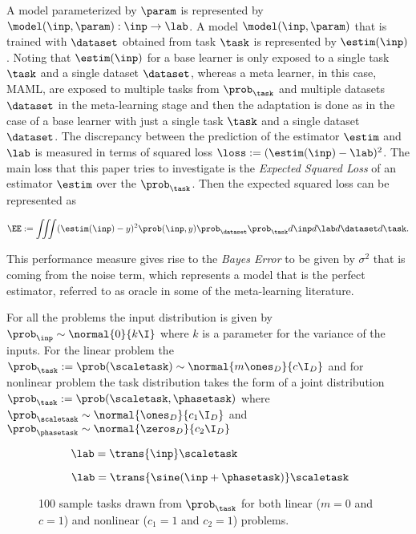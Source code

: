 A model parameterized by $\param$ is represented by $\model(\inp, \param):\inp\to\lab$. A model $\model(\inp, \param)$ that is trained with $\dataset$ obtained from  task $\task$ is represented by $\estim(\inp)$. Noting that $\estim(\inp)$ for a base learner is only exposed to a single task $\task$ and a single dataset $\dataset$, whereas a meta learner, in this case, MAML, are exposed to multiple tasks from $\prob_\task$ and multiple datasets $\dataset$ in the meta-learning stage and then the adaptation is done as in the case of a base learner with just a single task $\task$ and a single dataset $\dataset$.  The discrepancy between the prediction of the estimator $\estim$ and $\lab$ is measured in terms of squared loss $\loss:=(\estim(\inp)-\lab)^2$. The main loss that this paper tries to investigate is the \textit{Expected Squared Loss} of an estimator $\estim$ over the $\prob_{\task}$. Then the expected squared loss can be represented as

\begin{equation}\label{eq:ee}
  \EE:= \iiint(\estim(\inp) - y)^2\prob(\inp, y)\prob_{\dataset}\prob_{\task} d\inp d\lab d\dataset d\task.
\end{equation}


This performance measure gives rise to the \textit{Bayes Error} to be given by $\sigma^2$ that is coming from the noise term, which represents a model that is the perfect estimator, referred to as oracle in some of the meta-learning literature.

For all the problems the input distribution is given by $\prob_\inp\sim\normal{0}{k\I}$ where $k$ is a parameter for the variance of the inputs. For the linear problem the $\prob_\task:=\prob(\scaletask)\sim\normal{{m\ones_{D}}}{{c\I_{D}}}$ and for nonlinear problem the task distribution takes the form of a joint distribution $\prob_\task:=\prob(\scaletask, \phasetask)$ where $\prob_{\scaletask}\sim\normal{\ones_{D}}{c_1\I_{D}}$ and $\prob_{\phasetask}\sim\normal{\zeros_{D}}{c_2\I_{D}}$

\begin{figure}[ht!]
  \centering
  \begin{subfigure}[b]{0.49\textwidth}
    \centering
    \caption{$\lab = \trans{\inp}\scaletask$}
    \label{fig:lintasks}
  \end{subfigure}
  \begin{subfigure}[b]{0.49\textwidth}
    \centering
    \caption{$\lab = \trans{\sine(\inp+\phasetask)}\scaletask$}
    \label{fig:nonlintasks}
  \end{subfigure}
  \caption{100 sample tasks drawn from $\prob_\task$ for both linear ($m=0$ and $c=1$) and nonlinear ($c_1=1$ and $c_2=1$) problems.}
\end{figure}

